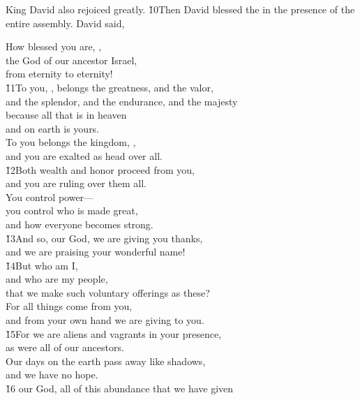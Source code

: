 King David also rejoiced greatly. \v{10}Then David blessed the  in the presence of the entire assembly. David said,

\begin{poetry}
\poeml How blessed you are, , \\
\poemll    the God of our ancestor Israel, \\
\poemlll       from eternity to eternity! \\
\poeml \v{11}To you, , belongs the greatness, and the valor, \\
\poemll    and the splendor, and the endurance, and the majesty \\
\poeml because all that is in heaven \\
\poemll    and on earth is yours. \\
\poeml To you belongs the kingdom, , \\
\poemll    and you are exalted as head over all. \\
\poeml \v{12}Both wealth and honor proceed from you, \\
\poemll    and you are ruling over them all. \\
\poeml You control power--- \\
\poemll    you control who is made great, \\
\poemlll       and how everyone becomes strong. \\
\poeml \v{13}And so, our God, we are giving you thanks, \\
\poemll    and we are praising your wonderful name! \\
\poeml \v{14}But who am I, \\
\poemll    and who are my people, \\
\poemlll       that we make such voluntary offerings as these? \\
\poeml For all things come from you, \\
\poemll    and from your own hand we are giving to you. \\
\poeml \v{15}For we are aliens and vagrants in your presence, \\
\poemll    as were all of our ancestors. \\
\poeml Our days on the earth pass away like shadows, \\
\poemll    and we have no hope. \\
\poeml \v{16} our God, all of this abundance that we have given \\

\end{poetry}
